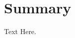 \documentclass[12pt]{article}
\begin{document}
\ddheader

\tableofcontents
\thispagestyle{empty}

\section{Summary}
\label{sec:summery}

Text Here.



\end{document}
